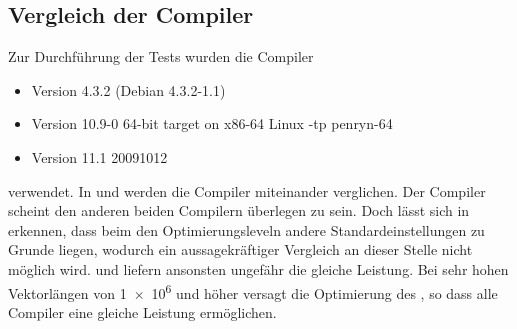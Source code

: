 % 
% 
% 
% 
% 
% 
% 
% 
% 
% 
% 
% 
% 

\subsection{Vergleich der Compiler}
Zur Durchführung der Tests wurden die Compiler
\begin{itemize}
 \item \gcc Version 4.3.2 (Debian 4.3.2-1.1) 
 \item \pgcc Version 10.9-0 64-bit target on x86-64 Linux -tp penryn-64 
 \item \icc Version 11.1 20091012
\end{itemize}
verwendet. In  und  werden die Compiler miteinander
verglichen. Der Compiler \pgcc scheint den anderen beiden Compilern überlegen
zu sein. Doch lässt sich in  erkennen, dass beim \pgcc den
Optimierungsleveln andere Standardeinstellungen zu Grunde liegen, wodurch ein
aussagekräftiger Vergleich an dieser Stelle nicht möglich wird. \icc und \gcc
liefern ansonsten ungefähr die gleiche Leistung. Bei sehr hohen Vektorlängen
von \num{1e6} und höher versagt die Optimierung des \pgcc, so dass alle Compiler
eine gleiche Leistung ermöglichen.

